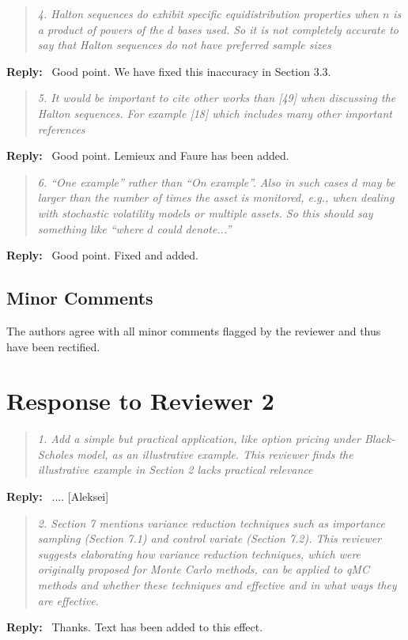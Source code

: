 \documentclass[11pt]{article}
\newenvironment{response}{%
  \vspace{1em}
  \begin{quote}\itshape
}{%
  \end{quote}
  \noindent\textbf{Reply:}~
}
\begin{document}
\begin{response}{4.}
Halton sequences do exhibit specific equidistribution properties when $n$ is a product of powers of the $d$ bases used. So it is not completely accurate to say that Halton sequences do not have preferred sample sizes
\end{response}
Good point. We have fixed this inaccuracy in Section 3.3.



\begin{response}{5.}
    It would be important to cite other works than [49] when discussing the Halton sequences. For example [18] which includes many other important references
\end{response}
Good point. Lemieux and Faure has been added.


\begin{response}{6.}
“One example” rather than “On example”. Also in such cases $d$ may be larger than the number of times the asset is monitored, e.g., when dealing with stochastic volatility models or multiple assets. So this should say something like “where $d$ could denote...”
\end{response}
Good point. Fixed and added.


\subsection*{Minor Comments}

The authors agree with all minor comments  flagged by the reviewer and thus have been rectified.



\newpage

\section*{Response to Reviewer 2}


\begin{response}{1.}
    Add a simple but practical application, like option pricing under Black-Scholes model, as an illustrative example. This reviewer finds the illustrative example in Section 2 lacks practical relevance
\end{response}
.... [Aleksei]



\begin{response}{2.}
    Section 7 mentions variance reduction techniques such as importance sampling (Section 7.1) and control variate (Section 7.2). This reviewer suggests elaborating how variance reduction techniques, which were originally proposed for Monte Carlo methods, can be applied to qMC methods and whether these techniques and effective and in what ways they are effective.
\end{response}
Thanks.  Text has been added to this effect.
\end{document}
